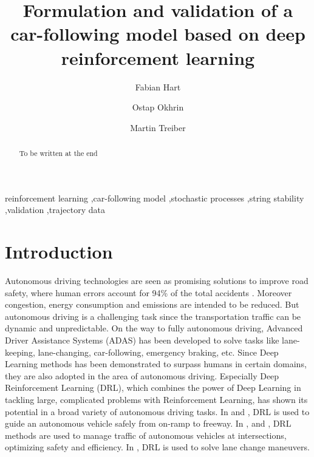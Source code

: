 \documentclass[review]{elsarticle}
\providecommand{\3}{{\ss}}
\begin{document}
\begin{frontmatter}

\title{Formulation and validation of a car-following model based on deep
  reinforcement learning}


\author[firstAddress]{Fabian Hart}
\author[firstAddress,secondAddress]{Ostap Okhrin}
\author[firstAddress,secondAddress]{Martin Treiber}

\address[firstAddress]{TU Dresden}
\address[secondAddress]{Possible second address}




\begin{abstract}
To be written at the end
\end{abstract}

\begin{keyword}
reinforcement learning \sep car-following model \sep stochastic
processes \sep string stability \sep validation \sep trajectory data 
\end{keyword}

\end{frontmatter}


\section{Introduction}

Autonomous driving technologies are seen as promising solutions to improve road safety, where human errors account for 94\% of the total accidents \cite{vehicleCrashSurvey2015}. Moreover congestion, energy consumption and emissions are intended to be reduced. 
But autonomous driving is a challenging task since the transportation traffic can be dynamic and unpredictable.
On the way to fully autonomous driving, Advanced Driver Assistance Systems
(ADAS) has been developed to solve tasks like lane-keeping, lane-changing, car-following, emergency braking, etc.
Since Deep Learning methods has been demonstrated to surpass humans in certain domains, they are also adopted in the area of autonomous driving.
Especially Deep Reinforcement Learning (DRL), which combines the power of Deep Learning in tackling large, complicated problems with Reinforcement Learning, has shown its potential in a broad variety of autonomous driving tasks. 
In \cite{OnRampMerge2018} and \cite{OnRampMerge2020}, DRL is used to guide an autonomous vehicle safely from on-ramp to freeway. In \cite{intersection1}, \cite{intersection3} and \cite{intersection2}, DRL methods are used to manage traffic of autonomous vehicles at intersections, optimizing safety and efficiency.
In \cite{LangeChange1}, DRL is used to solve lane change maneuvers.
\end{document}
